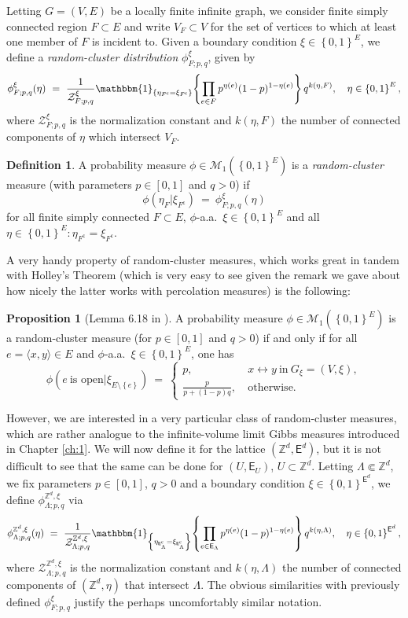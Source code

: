 \documentclass[12pt]{article}
\newcommand{\E}{\mathsf{E}}
\newcommand{\M}{\mathcal{M}}
\newcommand{\Z}{\mathbb{Z}}
\newcommand{\ZZ}{\mathcal{Z}}
\newcommand{\set}[1]{\left\{#1\right\}}
\newcommand{\1}{\mathbbm{1}}
\renewcommand{\sp}[1]{\langle #1\rangle}
\renewcommand{\c}{\mathsf{c}}
\newcommand{\5}{\vspace{0.5cm}}
\theoremstyle{definition}
\newtheorem{prop}[thm]{Proposition}
\newtheorem{df}[thm]{Definition}
\begin{document}
Letting $G=(V,E)$ be a locally finite infinite graph, we consider finite simply connected region $F\subset E$ and write $V_F\subset V$ for the set of vertices to which at least one member of $F$ is incident to. Given a boundary condition $\xi\in\set{0,1}^E$, we define a \textit{random-cluster distribution} $\phi_{F;p,q}^{\xi}$, given by 
$$\phi_{F;p,q}^{\xi}(\eta) ~=~ \frac{1}{\ZZ_{F;p,q}^\xi}\1_{\set{\eta_{F^\c}=\xi_{F^\c}}}\!\set{\prod_{e\in F}p^{\eta(e)}(1-p)^{1-\eta(e)}}q^{k(\eta,F)}, \quad \eta\in\set{0,1}^E,$$
where $\ZZ_{F;p,q}^\xi$ is the normalization constant and $k(\eta,F)$ the number of connected components of $\eta$ which intersect $V_F$.

\begin{df}
A probability measure $\phi\in\M_1(\set{0,1}^E)$ is a \textit{random-cluster} measure (with parameters $p\in[0,1]$ and $q>0$) if
$$\phi(\eta_F|\xi_{F^\c}) ~=~ \phi_{F;p,q}^\xi(\eta)$$
for all finite simply connected $F\subset E$, $\phi$-a.a.~$\xi\in\set{0,1}^E$ and all $\eta\in\set{0,1}^E:\eta_{F^\c}=\xi_{F^\c}$.
\end{df}

A very handy property of random-cluster measures, which works great in tandem with Holley's Theorem (which is very easy to see given the remark we gave about how nicely the latter works with percolation measures) is the following:
\begin{prop}[Lemma 6.18 in \cite{GHM}]\label{prop:e open}
A probability measure $\phi\in\M_1(\set{0,1}^E)$ is a random-cluster measure (for $p\in[0,1]$ and $q>0$) if and only if for all $e=\sp{x,y}\in E$ and $\phi$-a.a.~$\xi\in\set{0,1}^E$, one has
$$\phi(e~\text{is open}|\xi_{E\setminus\set{e}}) ~=~ \begin{cases}
p, ~&x\leftrightarrow y~\text{in}~G_\xi=(V,\xi), \\
\frac{p}{p+(1-p)q},~&\text{otherwise}.
\end{cases}$$
\end{prop}

However, we are interested in a very particular class of random-cluster measures, which are rather analogue to the infinite-volume limit Gibbs measures introduced in Chapter \ref{ch:1}. We will now define it for the lattice $(\Z^d,\E^d)$, but it is not difficult to see that the same can be done for $(U,\E_U)$, $U\subset\Z^d$. Letting $\Lambda\Subset\Z^d$, we fix parameters $p\in[0,1]$, $q>0$ and a boundary condition $\xi\in\set{0,1}^{\E^d}$, we define $\phi_{\Lambda;p,q}^{\Z^d,\xi}$ via
$$\phi_{\Lambda;p,q}^{\Z^d,\xi}(\eta) ~=~ \frac{1}{\ZZ_{\Lambda;p,q}^{\Z^d,\xi}}\1_{\set{\eta_{\E_\Lambda^\c}=\xi_{\E_\Lambda^\c}}}\!\set{\prod_{e\in\E_\Lambda}p^{\eta(e)}(1-p)^{1-\eta(e)}}q^{k(\eta,\Lambda)}, \quad \eta\in\set{0,1}^{\E^d},$$
where $\ZZ_{\Lambda;p,q}^{\Z^d,\xi}$ is the normalization constant and $k(\eta,\Lambda)$ the number of connected components of $(\Z^d,\eta)$ that intersect $\Lambda$. The obvious similarities with previously defined $\phi_{F;p,q}^{\xi}$ justify the perhaps uncomfortably similar notation. \\
\end{document}
